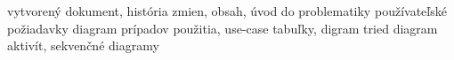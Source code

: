\begin{versionhistory}
        {vytvorený dokument, história zmien, obsah, úvod do problematiky}
        {používateľské požiadavky}
        {diagram prípadov použitia, use-case tabuľky, digram tried}
        {diagram aktivít, sekvenčné diagramy}
\end{versionhistory}
